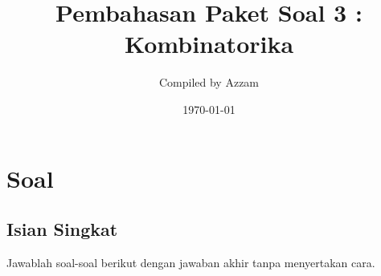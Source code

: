\documentclass[12pt]{scrartcl}
\begin{document}
	\title{Pembahasan Paket Soal 3 : Kombinatorika} %
	\date{\today}
	\author{Compiled by Azzam}
	\maketitle

\renewcommand*\contentsname{Daftar Isi}
\tableofcontents

\newpage
	\newpage
	
	\section{Soal}
\subsection{Isian Singkat}
Jawablah soal-soal berikut dengan jawaban akhir tanpa menyertakan cara.
\end{document}
